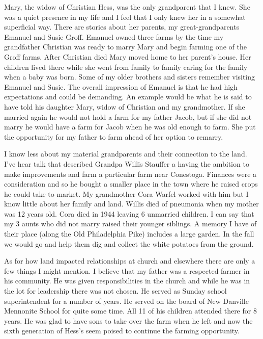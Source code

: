Mary, the widow of Christian Hess, was the only grandparent that I knew.
She was a quiet presence in my life and I feel that I only knew her in a somewhat superficial way.
There are stories about her parents, my great-grandparents Emanuel and Susie Groff.
Emanuel owned three farms by the time my grandfather Christian was ready to marry Mary and begin farming one of the Groff farms.
After Christian died Mary moved home to her parent's house.
Her children lived there while she went from family to family caring for the family when a baby was born.
Some of my older brothers and sisters remember visiting Emanuel and Susie.
The overall impression of Emanuel is that he had high expectations and could be demanding.
An example would be what he is said to have told his daughter Mary, widow of Christian and my grandmother.
If she married again he would not hold a farm for my father Jacob, but if she did not marry he would have a farm for Jacob when he was old enough to farm.
She put the opportunity for my father to farm ahead of her option to remarry.

I know less about my material grandparents and their connection to the land.
I've hear talk that described Grandpa Willis Stauffer a having the ambition to make improvements and farm a particular farm near Conestoga.
Finances were a consideration and so he bought a smaller place in the town where he raised crops he could take to market.
My grandmother Cora Warfel worked with him but I know little about her family and land.
Willis died of pneumonia when my mother was 12 years old.
Cora died in 1944 leaving 6 unmarried children.
I can say that my 3 aunts who did not marry raised their younger siblings.
A memory I have of their place (along the Old Philadelphia Pike) includes a large garden.
In the fall we would go and help them dig and collect the white potatoes from the ground.

As for how land impacted relationships at church and elsewhere there are only a few things I might mention.
I believe that my father was a respected farmer in his community.
He was given responsibilities in the church and while he was in the lot for leadership there was not chosen.
He served as Sunday school superintendent for a number of years.
He served on the board of New Danville Mennonite School for quite some time.
All 11 of his children attended there for 8 years.
He was glad to have sons to take over the farm when he left and now the sixth generation of Hess's seem poised to continue the farming opportunity.








